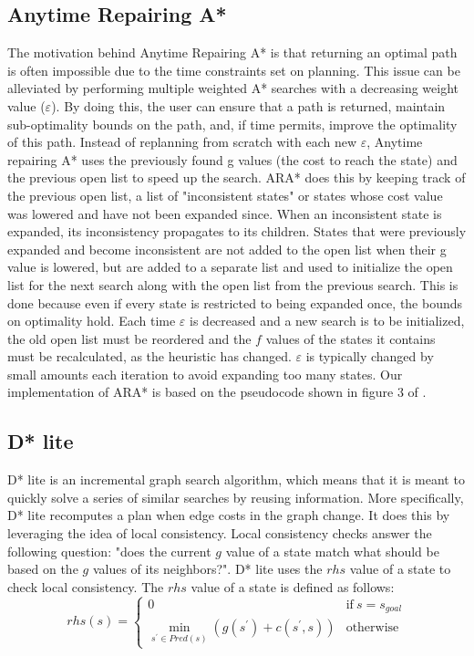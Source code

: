 \documentclass{article}
\begin{document}
\subsection{Anytime Repairing A*}
\quad The motivation behind Anytime Repairing A* is that returning an optimal path is often impossible due to the time constraints set on planning. This issue can be alleviated by performing multiple weighted A* searches with a decreasing weight value ($\varepsilon$). By doing this, the user can ensure that a path is returned, maintain sub-optimality bounds on the path, and, if time permits, improve the optimality of this path. Instead of replanning from scratch with each new $\varepsilon$, Anytime repairing A* uses the previously found g values (the cost to reach the state) and the previous open list to speed up the search. ARA* does this by keeping track of the previous open list, a list of "inconsistent states" or states whose cost value was lowered and have not been expanded since. When an inconsistent state is expanded, its inconsistency propagates to its children. States that were previously expanded and become inconsistent are not added to the open list when their g value is lowered, but are added to a separate list and used to initialize the open list for the next search along with the open list from the previous search. This is done because even if every state is restricted to being expanded once, the bounds on optimality hold. Each time $\varepsilon$ is decreased and a new search is to be initialized, the old open list must be reordered and the $f$ values of the states it contains must be recalculated, as the heuristic has changed. $\varepsilon$ is typically changed by small amounts each iteration to avoid expanding too many states. Our implementation of ARA* is based on the pseudocode shown in figure 3 of \cite{ara_star}.
\subsection{D* lite} \label{sec: D* lite}
\quad D* lite is an incremental graph search algorithm, which means that it is meant to quickly solve a series of similar searches by reusing information. More specifically, D* lite recomputes a plan when edge costs in the graph change. It does this by leveraging the idea of local consistency. Local consistency checks answer the following question: "does the current $g$ value of a state match what should be based on the $g$ values of its neighbors?". D* lite uses the $rhs$ value of a state to check local consistency. The $rhs$ value of a state is defined as follows:
$$
rhs(s)=\begin{cases}
   0 & \text{if} \: s=s_{goal}\\
   \min_{s^{'} \in Pred(s)}(g(s^{'})+c(s^{'},s)) & \text{otherwise}
\end{cases}
$$
\end{document}
